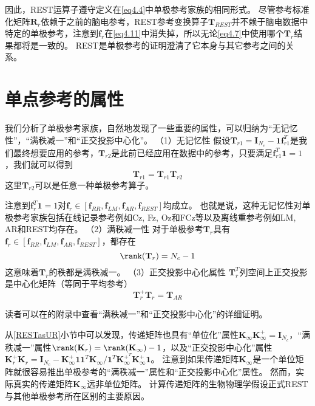 因此，REST运算子遵守定义在\eqref{eq4.4}中单极参考家族的相同形式。 尽管参考标准化矩阵$\mathbf{R}_r$依赖于之前的脑电参考，REST参考变换算子$\mathbf{T}_{REST}$并不赖于脑电数据中特定的单极参考，注意到$\mathbf{f}_r$在\eqref{eq4.11}中消失掉，所以无论\eqref{eq4.7}中使用哪个$\mathbf{T}_r$结果都将是一致的。 REST是单极参考的证明澄清了它本身与其它参考之间的关系。

\section{单点参考的属性}
我们分析了单极参考家族，自然地发现了一些重要的属性，可以归纳为“无记忆性”，“满秩减一”和“正交投影中心化”。
（1）无记忆性
假设$\mathbf{T}_{r1}=\mathbf{I}_{N_c}-\mathbf{1f}_{r1}^T$是我们最终想要应用的参考，$\mathbf{T}_{r2}$是此前已经应用在数据中的参考，只要满足$\mathbf{f}_{r1}^T\mathbf{1}=1$，我们就可以得到
\begin{equation}\label{eq4.12}
\mathbf{T}_{r1}=\mathbf{T}_{r1}\mathbf{T}_{r2}
\end{equation}
这里$\mathbf{T}_{r2}$可以是任意一种单极参考算子。

注意到$\mathbf{f}_r^T\mathbf{1}=1$对$\mathbf{f}_r\in{[\mathbf{f}_{RR},\mathbf{f}_{LM},\mathbf{f}_{AR},\mathbf{f}_{REST}]}$均成立。 也就是说，这种无记忆性对单极参考家族包括在线记录参考例如Cz, Fz, Oz和FCz等以及离线重参考例如LM, AR和REST均存在。
（2）满秩减一性
对于单极参考$\mathbf{T}_r$具有$\mathbf{f}_r\in{[\mathbf{f}_{RR},\mathbf{f}_{LM},\mathbf{f}_{AR},\mathbf{f}_{REST}]}$，都存在
\begin{equation}\label{eq4.13}
\rank(\mathbf{T}_r)=N_c-1
\end{equation}
这意味着$\mathbf{T}_r$的秩都是满秩减一。
（3）正交投影中心化属性
$\mathbf{T}_r^T$列空间上正交投影是中心化矩阵（等同于平均参考）
\begin{equation}\label{eq4.14}
\mathbf{T}_r^+\mathbf{T}_r=\mathbf{T}_{AR}
\end{equation}

读者可以在\cite{hu_unified_2018}的附录中查看“满秩减一”和“正交投影中心化”的详细证明。

从\ref{RESTasUR}小节中可以发现，传递矩阵也具有“单位化”属性$\mathbf{K}_{\infty}\mathbf{K}_{\infty}^+=\mathbf{I}_{N_c}$，“满秩减一”属性$\rank(\mathbf{K}_r)=\rank(\mathbf{K}_{\infty})-1$，以及“正交投影中心化”属性$\mathbf{K}_r^+\mathbf{K}_r=\mathbf{I}_{N_c}-\mathbf{K}_{\infty}^+\mathbf{11}^T\mathbf{K}_{\infty}/{\mathbf{1}^T\mathbf{K}_{\infty}^{+^T}\mathbf{K}_{\infty}^+\mathbf{1}}$。 注意到如果传递矩阵$\mathbf{K}_{\infty}$是一个单位矩阵就很容易推出单极参考的“满秩减一”属性和“正交投影中心化”属性。 然而，实际真实的传递矩阵$\mathbf{K}_{\infty}$远非单位矩阵。 计算传递矩阵的生物物理学假设正式REST与其他单极参考所在区别的主要原因。

